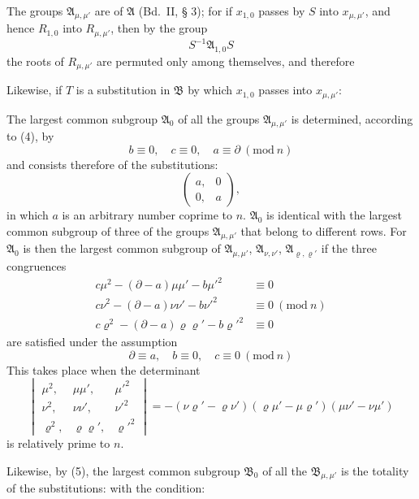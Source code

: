 
The groups $\mathfrak{A}_{\mu,\mu'}$ are  of $\mathfrak{A}$
(Bd.\ II, § 3); for if $x_{1,0}$ passes by $S$ into $x_{\mu,\mu'}$, and hence $R_{1,0}$ into $R_{\mu,\mu'}$,
then by the group
\[
S^{-1}\mathfrak{A}_{1,0}S
\]
the roots of $R_{\mu,\mu'}$ are permuted only among themselves, and therefore

Likewise, if $T$ is a substitution in $\mathfrak{B}$ by which
$x_{1,0}$ passes into $x_{\mu,\mu'}$:

The largest common subgroup $\mathfrak{A}_0$ of all the groups $\mathfrak{A}_{\mu,\mu'}$
is determined, according to (4), by
\[
b \equiv 0, \quad c \equiv 0, \quad a \equiv \partial \ (\mathrm{mod}\ n)
\]
and consists therefore of the substitutions:
\[
\begin{pmatrix} a, & 0 \\ 0, & a \end{pmatrix},
\]
in which $a$ is an arbitrary number coprime to $n$. $\mathfrak{A}_0$ is identical
with the largest common subgroup of three of the groups $\mathfrak{A}_{\mu,\mu'}$
that belong to different rows. For $\mathfrak{A}_0$ is then
the largest common subgroup of $\mathfrak{A}_{\mu,\mu'}$, $\mathfrak{A}_{\nu,\nu'}$, $\mathfrak{A}_{\varrho,\varrho'}$ if
the three congruences
\[
\begin{aligned}
c\mu^2 - (\partial - a)\mu\mu' - b\mu'^2 &\equiv 0 \\
c\nu^2 - (\partial - a)\nu\nu' - b\nu'^2 &\equiv 0 \ (\mathrm{mod}\ n) \\
c\varrho^2 - (\partial - a)\varrho\varrho' - b\varrho'^2 &\equiv 0
\end{aligned}
\]
are satisfied  under the assumption
\[
\partial \equiv a, \quad b \equiv 0, \quad c \equiv 0 \ (\mathrm{mod}\ n)
\]
This takes place when the determinant
\[
\begin{vmatrix} \mu^2, & \mu\mu', & \mu'^2 \\ \nu^2, & \nu\nu', & \nu'^2 \\ \varrho^2, & \varrho\varrho', & \varrho'^2 \end{vmatrix}
= -(\nu\varrho' - \varrho\nu')(\varrho\mu' - \mu\varrho')(\mu\nu' - \nu\mu')
\]
is relatively prime to $n$.

Likewise, by (5), the largest common subgroup $\mathfrak{B}_0$
of all the $\mathfrak{B}_{\mu,\mu'}$ is the totality of the substitutions:
with the condition:
